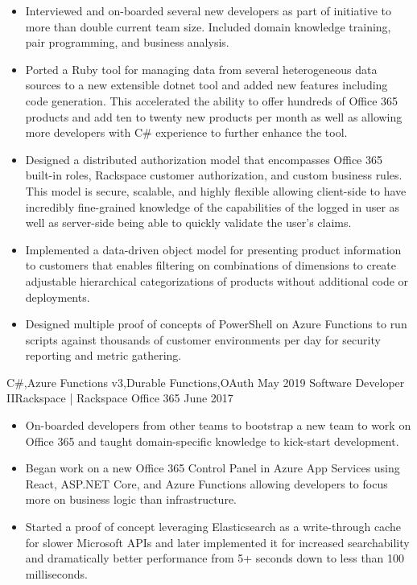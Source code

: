 \begin{experiences}
{\begin{itemize}
                        \item Interviewed and on-boarded several new developers as part of initiative to more than double current team size. Included domain knowledge training, pair programming, and business analysis.
                        \item Ported a Ruby tool for managing data from several heterogeneous data sources to a new extensible dotnet tool and added new features including code generation. This accelerated the ability to offer hundreds of Office 365 products and add ten to twenty new products per month as well as allowing more developers with C\# experience to further enhance the tool.
                        \item Designed a distributed authorization model that encompasses Office 365 built-in roles, Rackspace customer authorization, and custom business rules. This model is secure, scalable, and highly flexible allowing client-side to have incredibly fine-grained knowledge of the capabilities of the logged in user as well as server-side being able to quickly validate the user's claims.
                        \item Implemented a data-driven object model for presenting product information to customers that enables filtering on combinations of dimensions to create adjustable hierarchical categorizations of products without additional code or deployments.
                        \item Designed multiple proof of concepts of PowerShell on Azure Functions to run scripts against thousands of customer environments per day for security reporting and metric gathering.
                      \end{itemize}
                    }
                    {C\#,Azure Functions v3,Durable Functions,OAuth}
  \emptySeparator
  \experience
    {May 2019}     {Software Developer II}{Rackspace | Rackspace Office 365}
    {June 2017}    {
                      \begin{itemize}
                        \item On-boarded developers from other teams to bootstrap a new team to work on Office 365 and taught domain-specific knowledge to kick-start development.
                        \item Began work on a new Office 365 Control Panel in Azure App Services using React, ASP.NET Core, and Azure Functions allowing developers to focus more on business logic than infrastructure.
                        \item Started a proof of concept leveraging Elasticsearch as a write-through cache for slower Microsoft APIs and later implemented it for increased searchability and dramatically better performance from 5+ seconds down to less than 100 milliseconds.

\end{itemize}}
\end{experiences}
